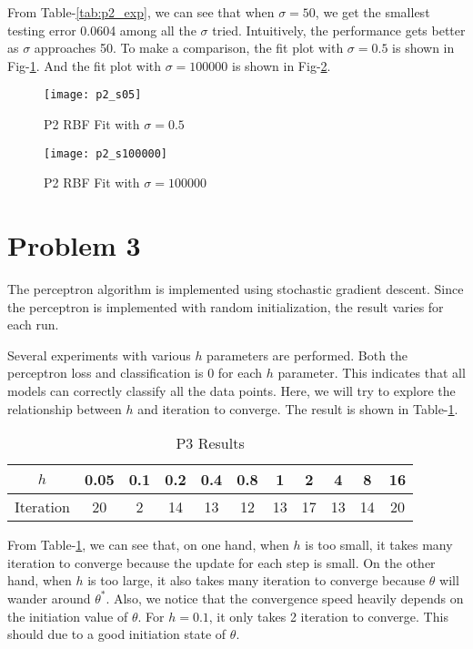 \documentclass[12pt]{article}
\begin{document}
From Table-\ref{tab:p2_exp}, we can see that when $\sigma = 50$, we get the smallest testing error 0.0604 among all the $\sigma$ tried. Intuitively, the performance gets better as $\sigma$ approaches 50. To make a comparison, the fit plot with $\sigma = 0.5$ is shown in Fig-\ref{fig:p2_s05}. And the fit plot with $\sigma = 100000$ is shown in Fig-\ref{fig:p2_s100000}.

\begin{figure}[ht!]
  \centering
  \texttt{[image: p2\_s05]}
  \caption{P2 RBF Fit with $\sigma = 0.5$ \label{fig:p2_s05}}
\end{figure}

\begin{figure}[ht!]
  \centering
  \texttt{[image: p2\_s100000]}
  \caption{P2 RBF Fit with $\sigma = 100000$ \label{fig:p2_s100000}}
\end{figure}

\section{Problem 3}

The perceptron algorithm is implemented using stochastic gradient descent. Since the perceptron is implemented with random initialization, the result varies for each run. 

Several experiments with various $h$ parameters are performed. Both the perceptron loss and classification is 0 for each $h$ parameter. This indicates that all models can correctly classify all the data points. Here, we will try to explore the relationship between $h$ and iteration to converge. The result is shown in Table-\ref{tab:p3_cov}.

\begin{table}[ht!]
  \begin{center}
    \begin{tabular}{|c|c|c|c|c|c|c|c|c|c|c|}
      \hline
      $h$	  & 0.05 & 0.1 & 0.2 & 0.4 & 0.8 & 1  & 2  &  4
      	          &   8  &  16 \\ \hline
      Iteration   &  20  &  2  & 14  & 13  & 12  & 13 & 17 & 13
      		  &  14  &  20 \\ \hline
    \end{tabular}
  \end{center}
  \caption{P3 Results\label{tab:p3_cov}}
\end{table}

From Table-\ref{tab:p3_cov}, we can see that, on one hand, when $h$ is too small, it takes many iteration to converge because the update for each step is small. On the other hand, when $h$ is too large, it also takes many iteration to converge because $\theta$ will wander around $\theta^*$. Also, we notice that the convergence speed heavily depends on the initiation value of $\theta$. For $h = 0.1$, it only takes 2 iteration to converge. This should due to a good initiation state of $\theta$.
\end{document}
